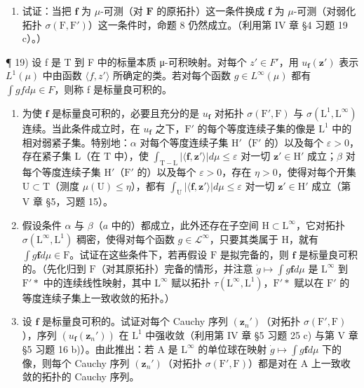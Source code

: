 \begin{enumerate}
\def\labelenumi{\arabic{enumi})}
\setcounter{enumi}{17}
\tightlist
\item
  试证：当把 \(\mathbf{f}\) 为 \(\mu\)-可测（对 \(\mathbf{F}\) 的原拓扑）这一条件换成 \(\mathbf{f}\) 为 \(\mu\)-可测（对弱化拓扑 \(\sigma(\mathrm{F},\mathrm{F}')\)）这一条件时，命题 8 仍然成立。（利用第 IV 章 §4 习题 19 c）。）
\end{enumerate}

¶ 19) 设 f 是 T 到 F 中的标量本质 μ-可积映射。对每个 \(z' \in F'\)，用 \(u_{\mathbf{f}}(\mathbf{z}')\) 表示 \(L^{1}(\mu)\) 中由函数 \(\langle f, z' \rangle\) 所确定的类。若对每个函数 \(g \in L^{\infty}(\mu)\) 都有 \(\int g f d\mu \in F\)，则称 f 是标量良可积的。

\begin{enumerate}
\def\labelenumi{\alph{enumi})}
\item
  为使 \(\mathbf{f}\) 是标量良可积的，必要且充分的是 \(u_{\mathbf{f}}\) 对拓扑 \(\sigma(\mathrm{F}',\mathrm{F})\) 与 \(\sigma(\mathrm{L}^1,\mathrm{L}^\infty)\) 连续。当此条件成立时，在 \(u_{\mathbf{f}}\) 之下，\(\mathrm{F}'\) 的每个等度连续子集的像是 \(\mathrm{L}^1\) 中的相对弱紧子集。特别地：\(\alpha\) 对每个等度连续子集 \(\mathrm{H}'\)（\(\mathrm{F}'\) 的）以及每个 \(\varepsilon >0\)，存在紧子集 \(\mathrm{L}\)（在 \(\mathrm{T}\) 中），使 \(\int_{\mathrm{T}-\mathrm{L}}|\langle\mathbf{f},\mathbf{z}'\rangle|d\mu\leqslant\varepsilon\) 对一切 \(\mathbf{z}'\in\mathrm{H}'\) 成立；\(\beta\) 对每个等度连续子集 \(\mathrm{H}'\)（\(\mathrm{F}'\) 的）以及每个 \(\varepsilon>0\)，存在 \(\eta>0\)，使得对每个开集 \(\mathrm{U}\subset\mathrm{T}\)（测度 \(\mu(\mathrm{U})\leqslant\eta\)），都有 \(\int_{\mathrm{U}}|\langle\mathbf{f},\mathbf{z}'\rangle|d\mu\leqslant\varepsilon\) 对一切 \(\mathbf{z}'\in\mathrm{H}'\) 成立（第 V 章 §5，习题 15）。
\item
  假设条件 \(\alpha\) 与 \(\beta\)（\(a\) 中的）都成立，此外还存在子空间 \(\mathrm{H} \subset \mathrm{L}^{\infty}\)，它对拓扑 \(\sigma(\mathrm{L}^{\infty}, \mathrm{L}^{1})\) 稠密，使得对每个函数 \(g \in \mathcal{L}^{\infty}\)，只要其类属于 \(\mathrm{H}\)，就有 \(\int g\mathbf{f}d\mu \in \mathrm{F}\)。试证在这些条件下，若再假设 \(\mathrm{F}\) 是拟完备的，则 \(\mathbf{f}\) 是标量良可积的。（先化归到 \(\mathrm{F}\)（对其原拓扑）完备的情形，并注意 \(\dot{g} \mapsto \int g\mathbf{f}d\mu\) 是 \(\mathrm{L}^{\infty}\) 到 \(\mathrm{F}'*\) 中的连续线性映射，其中 \(\mathrm{L}^{\infty}\) 赋以拓扑 \(\tau(\mathrm{L}^{\infty}, \mathrm{L}^{1})\)，\(\mathrm{F}'*\) 赋以在 \(\mathrm{F}'\) 的等度连续子集上一致收敛的拓扑。）
\item
  设 \(\mathbf{f}\) 是标量良可积的。试证对每个 Cauchy 序列 \((\mathbf{z}_n')\)（对拓扑 \(\sigma(\mathrm{F}',\mathrm{F})\)），序列 \((u_{\mathbf{f}}(\mathbf{z}_n'))\) 在 \(\mathrm{L}^1\) 中强收敛（利用第 IV 章 §5 习题 25 c) 与第 V 章 §5 习题 16 b)）。由此推出：若 A 是 \(\mathrm{L}^{\infty}\) 的单位球在映射 \(\dot{g} \mapsto \int g\mathbf{f}d\mu\) 下的像，则每个 Cauchy 序列 \((\mathbf{z}_n')\)（对拓扑 \(\sigma(\mathrm{F}',\mathrm{F})\)）都是对在 A 上一致收敛的拓扑的 Cauchy 序列。
\end{enumerate}

